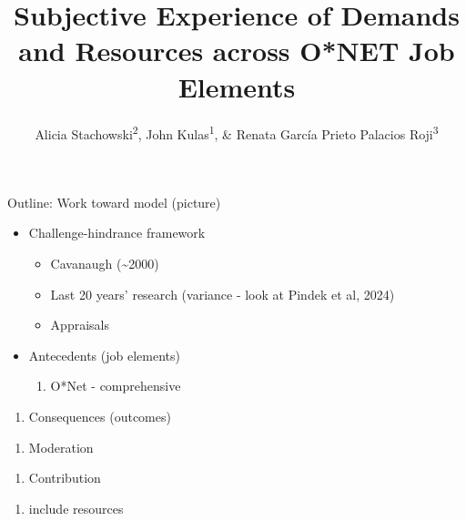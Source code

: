 \documentclass[
  jou,mask]{apa6}
\title{Subjective Experience of Demands and Resources across O*NET Job Elements}
\author{Alicia Stachowski\textsuperscript{2}, John Kulas\textsuperscript{1}, \& Renata García Prieto Palacios Roji\textsuperscript{3}}
\date{}
\affiliation{\vspace{0.5cm}\textsuperscript{1} eRg\\\textsuperscript{2} University of Wisconsin - Stout\\\textsuperscript{3} PepsiCo}
\providecommand{\tightlist}{%
  \setlength{\itemsep}{0pt}\setlength{\parskip}{0pt}}
\begin{document}
\maketitle

Outline:
Work toward model (picture)

\begin{itemize}
\tightlist
\item
  Challenge-hindrance framework

  \begin{itemize}
  \tightlist
  \item
    Cavanaugh (\textasciitilde2000)
  \item
    Last 20 years' research (variance - look at Pindek et al, 2024)
  \item
    Appraisals
  \end{itemize}
\item
  Antecedents (job elements)

  \begin{enumerate}
  \def\labelenumi{\alph{enumi}.}
  \tightlist
  \item
    O*Net - comprehensive
  \end{enumerate}
\end{itemize}

\begin{enumerate}
\def\labelenumi{\Roman{enumi}.}
\setcounter{enumi}{2}
\tightlist
\item
  Consequences (outcomes)
\end{enumerate}

\begin{enumerate}
\def\labelenumi{\alph{enumi}.}
\tightlist
\item
  Moderation
\end{enumerate}

\begin{enumerate}
\def\labelenumi{\Roman{enumi}.}
\setcounter{enumi}{3}
\tightlist
\item
  Contribution
\end{enumerate}

\begin{enumerate}
\def\labelenumi{\alph{enumi}.}
\tightlist
\item
  include resources
\end{enumerate}
\end{document}
